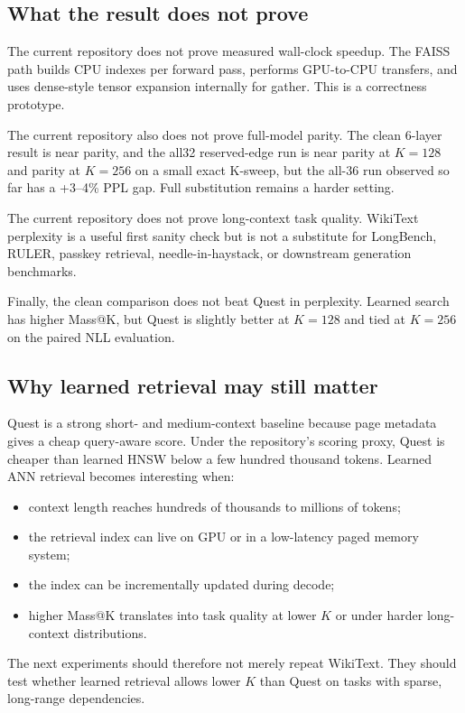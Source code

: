\documentclass[10pt]{article}
\begin{document}
\subsection{What the result does not prove}
The current repository does not prove measured wall-clock speedup. The FAISS
path builds CPU indexes per forward pass, performs GPU-to-CPU transfers, and
uses dense-style tensor expansion internally for gather. This is a correctness
prototype.

The current repository also does not prove full-model parity. The clean 6-layer
result is near parity, and the all32 reserved-edge run is near parity at
$K=128$ and parity at $K=256$ on a small exact K-sweep, but the all-36 run
observed so far has a +3--4\% PPL gap. Full substitution remains a harder
setting.

The current repository does not prove long-context task quality. WikiText
perplexity is a useful first sanity check but is not a substitute for LongBench,
RULER, passkey retrieval, needle-in-haystack, or downstream generation
benchmarks.

Finally, the clean comparison does not beat Quest in perplexity. Learned search
has higher Mass@K, but Quest is slightly better at $K=128$ and tied at $K=256$
on the paired NLL evaluation.

\subsection{Why learned retrieval may still matter}
Quest is a strong short- and medium-context baseline because page metadata gives
a cheap query-aware score. Under the repository's scoring proxy, Quest is
cheaper than learned HNSW below a few hundred thousand tokens. Learned ANN
retrieval becomes interesting when:
\begin{itemize}
    \item context length reaches hundreds of thousands to millions of tokens;
    \item the retrieval index can live on GPU or in a low-latency paged memory
    system;
    \item the index can be incrementally updated during decode;
    \item higher Mass@K translates into task quality at lower $K$ or under
    harder long-context distributions.
\end{itemize}
The next experiments should therefore not merely repeat WikiText. They should
test whether learned retrieval allows lower $K$ than Quest on tasks with sparse,
long-range dependencies.
\end{document}
